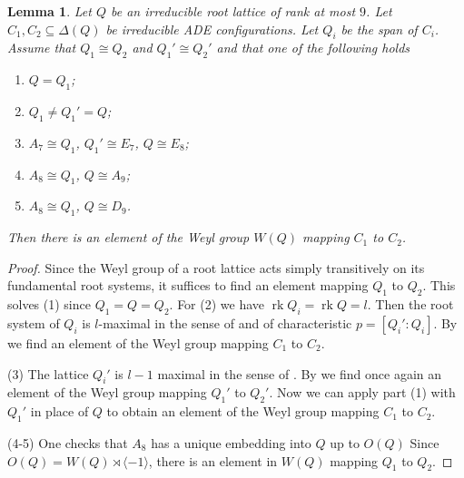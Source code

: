 \documentclass[a4paper]{amsart}
\theoremstyle{definition}
\theoremstyle{plain}
\newtheorem{lemma}[definition]{Lemma}
\DeclareMathOperator{\rk}{rk}
\begin{document}
\begin{lemma}\label{lem:root_sublattices_orbits}
Let $Q$ be an irreducible root lattice of rank at most $9$. Let $C_1,C_2 \subseteq \Delta(Q)$ be irreducible ADE configurations. Let $Q_i$ be the span of $C_i$.
Assume that $Q_1 \cong Q_2$ and $Q_1' \cong Q_2'$
and that one of the following holds
\begin{enumerate}
\item $Q=Q_1$;
\item $Q_1 \neq Q_1'=Q$;
\item $A_7 \cong Q_1$, $Q_1'\cong E_7$, $Q\cong E_8$;
\item $A_8 \cong Q_1$, $Q\cong A_9$;
\item $A_8 \cong Q_1$, $Q\cong D_9$.
\end{enumerate}
Then there is an element of the Weyl group $W(Q)$ mapping $C_1$ to $C_2$.
\end{lemma}
\begin{proof}
Since the Weyl group of a root lattice acts simply transitively on its fundamental root systems, it suffices to find an element mapping $Q_1$ to $Q_2$. This solves (1) since $Q_1=Q=Q_2$.
For (2) we have $\rk Q_i=\rk Q=l$. Then the root system of $Q_i$ is $l$-maximal in the sense of \cite[Definition 2.1]{wallach:subsystem} and of characteristic $p=[Q_i':Q_i]$. 
By \cite[Theorem 3.1]{wallach:subsystem} we find an element of the Weyl group mapping $C_1$ to $C_2$. 

(3) The lattice $Q_i'$ is $l-1$ maximal in the sense of \cite[Definition 2.1]{wallach:subsystem}. By \cite[Theorem 3.1]{wallach:subsystem} we find once again an element of the Weyl group mapping $Q_1'$ to $Q_2'$. Now we can apply part (1) with $Q_1'$ in place of $Q$ to obtain an element of the Weyl group mapping $C_1$ to $C_2$.


(4-5) One checks that $A_8$ has a unique embedding into $Q$ up to $O(Q)$
Since $O(Q)=W(Q)\rtimes \langle -1 \rangle$, there is an element in $W(Q)$ mapping $Q_1$ to $Q_2$.
\end{proof}

    
\end{document}

